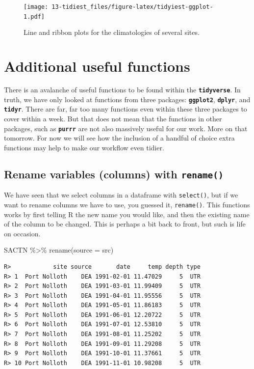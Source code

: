\documentclass[
]{book}
\newenvironment{Shaded}{\begin{snugshade}}{\end{snugshade}}
\newcommand{\AttributeTok}[1]{\textcolor[rgb]{0.77,0.63,0.00}{#1}}
\newcommand{\FunctionTok}[1]{\textcolor[rgb]{0.00,0.00,0.00}{#1}}
\newcommand{\NormalTok}[1]{#1}
\newcommand{\SpecialCharTok}[1]{\textcolor[rgb]{0.00,0.00,0.00}{#1}}
\begin{document}
\begin{figure}
\centering
\texttt{[image: 13-tidiest\_files/figure-latex/tidyiest-ggplot-1.pdf]}
\caption{\label{fig:tidyiest-ggplot}Line and ribbon plots for the climatologies of several sites.}
\end{figure}

\hypertarget{additional-useful-functions}{%
\section{Additional useful functions}\label{additional-useful-functions}}

There is an avalanche of useful functions to be found within the \textbf{\texttt{tidyverse}}. In truth, we have only looked at functions from three packages: \textbf{\texttt{ggplot2}}, \textbf{\texttt{dplyr}}, and \textbf{\texttt{tidyr}}. There are far, far too many functions even within these three packages to cover within a week. But that does not mean that the functions in other packages, such as \textbf{\texttt{purrr}} are not also massively useful for our work. More on that tomorrow. For now we will see how the inclusion of a handful of choice extra functions may help to make our workflow even tidier.

\hypertarget{rename-variables-columns-with-rename}{%
\subsection{\texorpdfstring{Rename variables (columns) with \texttt{rename()}}{Rename variables (columns) with rename()}}\label{rename-variables-columns-with-rename}}

We have seen that we select columns in a dataframe with \texttt{select()}, but if we want to rename columns we have to use, you guessed it, \texttt{rename()}. This functions works by first telling R the new name you would like, and then the existing name of the column to be changed. This is perhaps a bit back to front, but such is life on occasion.

\begin{Shaded}
\begin{Highlighting}[]
\NormalTok{SACTN }\SpecialCharTok{\%\textgreater{}\%} 
  \FunctionTok{rename}\NormalTok{(}\AttributeTok{source =}\NormalTok{ src)}
\end{Highlighting}
\end{Shaded}

\begin{verbatim}
R>            site source       date     temp depth type
R> 1  Port Nolloth    DEA 1991-02-01 11.47029     5  UTR
R> 2  Port Nolloth    DEA 1991-03-01 11.99409     5  UTR
R> 3  Port Nolloth    DEA 1991-04-01 11.95556     5  UTR
R> 4  Port Nolloth    DEA 1991-05-01 11.86183     5  UTR
R> 5  Port Nolloth    DEA 1991-06-01 12.20722     5  UTR
R> 6  Port Nolloth    DEA 1991-07-01 12.53810     5  UTR
R> 7  Port Nolloth    DEA 1991-08-01 11.25202     5  UTR
R> 8  Port Nolloth    DEA 1991-09-01 11.29208     5  UTR
R> 9  Port Nolloth    DEA 1991-10-01 11.37661     5  UTR
R> 10 Port Nolloth    DEA 1991-11-01 10.98208     5  UTR
\end{verbatim}
\end{document}
